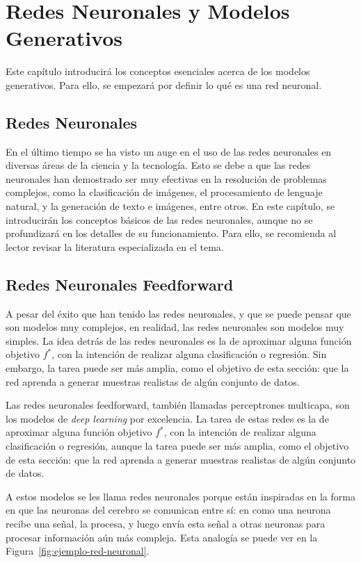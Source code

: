 \chapter{Redes Neuronales y Modelos Generativos}\label{chap:redes-neuronales-y-modelos-generativos}
{
Este capítulo introducirá los conceptos esenciales acerca de los modelos generativos. Para ello, se empezará por definir lo qué es una red neuronal.
\section{Redes Neuronales}\label{sec:redes-Neuronales}
{
En el último tiempo se ha visto un auge en el uso de las redes neuronales en diversas áreas de la ciencia y la tecnología. Esto se debe a que las redes neuronales han demostrado ser muy efectivas en la resolución de problemas complejos, como la clasificación de imágenes, el procesamiento de lenguaje natural, y la generación de texto e imágenes, entre otros. En este capítulo, se introducirán los conceptos básicos de las redes neuronales, aunque no se profundizará en los detalles de su funcionamiento. Para ello, se recomienda al lector revisar la literatura especializada en el tema.

\section{Redes Neuronales Feedforward}\label{sec:redes-neuronales-feedforward}
{
A pesar del éxito que han tenido las redes neuronales, y que se puede pensar que son modelos muy complejos, en realidad, las redes neuronales son modelos muy simples. La idea detrás de las redes neuronales es la de aproximar alguna función objetivo $f^\ast$, con la intención de realizar alguna clasificación o regresión. Sin embargo, la tarea puede ser más amplia, como el objetivo de esta sección: que la red aprenda a generar muestras realistas de algún conjunto de datos.


}



Las redes neuronales feedforward, también llamadas perceptrones multicapa, son los modelos de \textit{deep learning} por excelencia. La tarea de estas redes es la de aproximar alguna función objetivo $f^\ast$, con la intención de realizar alguna clasificación o regresión, aunque la tarea puede ser más amplia, como el objetivo de esta sección: que la red aprenda a generar muestras realistas de algún conjunto de datos.

A estos modelos se les llama redes neuronales porque están inspiradas en la forma en que las neuronas del cerebro se comunican entre sí: en como una neurona recibe una señal, la procesa, y luego envía esta señal a otras neuronas para procesar información aún más compleja. Esta analogía se puede ver en la Figura~\ref{fig:ejemplo-red-neuronal}.

}}
